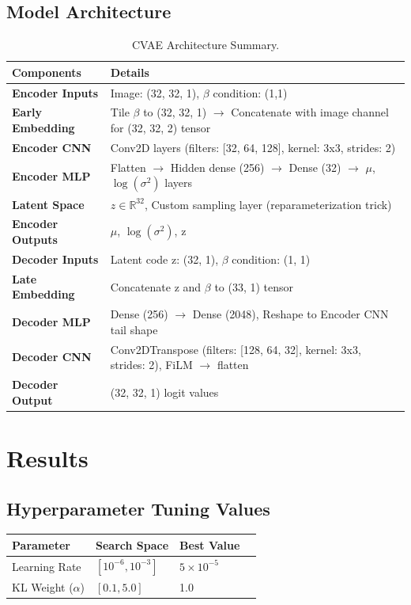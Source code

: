 \documentclass[11pt,a4paper]{article}
\begin{document}
\subsection{Model Architecture}
\begin{table}[H]
    \centering
    \renewcommand{\arraystretch}{1.2}
    \begin{tabular}{@{}ll@{}}
        \toprule
        \textbf{Components} & \textbf{Details} \\
        \midrule
        \textbf{Encoder Inputs} & Image: (32, 32, 1), $\beta$ condition: (1,1) \\
        \textbf{Early Embedding} & Tile $\beta$ to (32, 32, 1) $\to$ Concatenate with image channel for (32, 32, 2) tensor\\
        \textbf{Encoder CNN} & Conv2D layers (filters: [32, 64, 128], kernel: 3x3, strides: 2) \\
        \textbf{Encoder MLP} & Flatten $\to$ Hidden dense (256) $\to$ Dense (32) $\to$ $\mu$, $\log(\sigma^2)$ layers \\
        \textbf{Latent Space} & $z \in \mathbb{R}^{32}$, Custom sampling layer (reparameterization trick) \\
        \textbf{Encoder Outputs} & $\mu$, $\log(\sigma^2)$, z \\
        \textbf{Decoder Inputs} & Latent code z: (32, 1), $\beta$ condition: (1, 1) \\
        \textbf{Late Embedding} & Concatenate z and $\beta$ to (33, 1) tensor \\
        \textbf{Decoder MLP} & Dense (256) $\to$ Dense (2048), Reshape to Encoder CNN tail shape \\
        \textbf{Decoder CNN} & Conv2DTranspose (filters: [128, 64, 32], kernel: 3x3, strides: 2), FiLM $\to$ flatten \\
        \textbf{Decoder Output} & (32, 32, 1) logit values \\
        \bottomrule
    \end{tabular}
    \caption{CVAE Architecture Summary.}
\end{table}

\section{Results}

\subsection{Hyperparameter Tuning Values}
\begin{table}[H]
    \centering
    \renewcommand{\arraystretch}{1.2}
    \begin{tabular}{@{}lllc@{}}
        \toprule
        \textbf{Parameter} & \textbf{Search Space} & \textbf{Best Value} \\
        \midrule
        Learning Rate & $[10^{-6}, 10^{-3}]$ & $5 \times 10^{-5}$ \\
        KL Weight ($\alpha$) & $[0.1, 5.0]$ & 1.0 \\
        \bottomrule
    \end{tabular}
\end{table}
\end{document}
